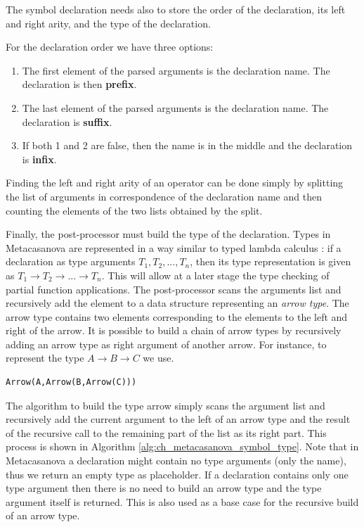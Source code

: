 The symbol declaration needs also to store the order of the declaration, its left and right arity, and the type of the declaration. 

For the declaration order we have three options:

\begin{enumerate}[noitemsep]
	\item The first element of the parsed arguments is the declaration name. The declaration is then \textbf{prefix}.
	\item The last element of the parsed arguments is the declaration name. The declaration is \textbf{suffix}.
	\item If both 1 and 2 are false, then the name is in the middle and the declaration is \textbf{infix}.
\end{enumerate}

Finding the left and right arity of an operator can be done simply by splitting the list of arguments in correspondence of the declaration name and then counting the elements of the two lists obtained by the split.

Finally, the post-processor must build the type of the declaration. Types in Metacasanova are represented in a way similar to typed lambda calculus \cite{barendregt2013lambda, church1940formulation}: if a declaration as type arguments $T_{1}, T_{2}, ..., T_{n}$, then its type representation is given as $T_{1} \rightarrow T_{2} \rightarrow ... \rightarrow T_{n}$. This will allow at a later stage the type checking of partial function applications. The post-processor scans the arguments list and recursively add the element to a data structure representing an \textit{arrow type}. The arrow type contains two elements corresponding to the elements to the left and right of the arrow. It is possible to build a chain of arrow types by recursively adding an arrow type as right argument of another arrow. For instance, to represent the type $A \rightarrow B \rightarrow C$ we use.

\begin{lstlisting}
Arrow(A,Arrow(B,Arrow(C)))
\end{lstlisting}

The algorithm to build the type arrow simply scans the argument list and recursively add the current argument to the left of an arrow type and the result of the recursive call to the remaining part of the list as its right part. This process is shown in Algorithm \ref{alg:ch_metacasanova_symbol_type}. Note that in Metacasanova a declaration might contain no type arguments (only the name), thus we return an empty type as placeholder. If a declaration contains only one type argument then there is no need to build an arrow type and the type argument itself is returned. This is also used as a base case for the recursive build of an arrow type.

